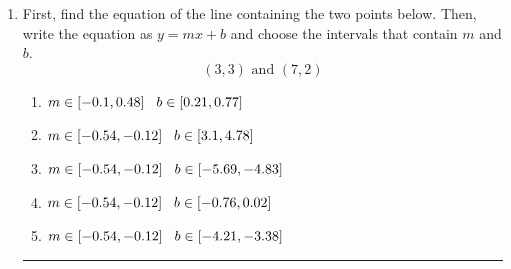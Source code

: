\documentclass[14pt]{extbook}
\newcommand{\litem}[1]{\item#1\hspace*{-1cm}\rule{\textwidth}{0.4pt}}
\begin{document}
\begin{enumerate}
{\begin{enumerate}[label=\Alph*.]
\end{enumerate} }
\litem{
First, find the equation of the line containing the two points below. Then, write the equation as $ y=mx+b $ and choose the intervals that contain $m$ and $b$.\[ (3, 3) \text{ and } (7, 2) \]\begin{enumerate}[label=\Alph*.]
\item \( m \in [-0.1, 0.48] \hspace*{3mm} b \in [0.21, 0.77] \)
\item \( m \in [-0.54, -0.12] \hspace*{3mm} b \in [3.1, 4.78] \)
\item \( m \in [-0.54, -0.12] \hspace*{3mm} b \in [-5.69, -4.83] \)
\item \( m \in [-0.54, -0.12] \hspace*{3mm} b \in [-0.76, 0.02] \)
\item \( m \in [-0.54, -0.12] \hspace*{3mm} b \in [-4.21, -3.38] \)

\end{enumerate} }
\end{enumerate}
\end{document}
